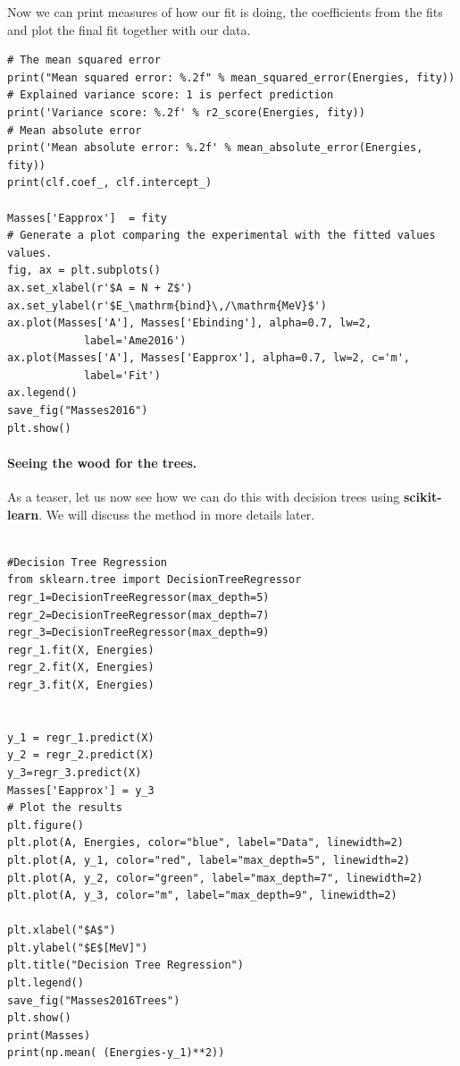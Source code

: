 \documentclass[%
oneside,                 %
final,                   %
10pt]{article}
\begin{document}
Now we can print measures of how our fit is doing, the coefficients from the fits and plot the final fit together with our data.
\begin{verbatim}
# The mean squared error                               
print("Mean squared error: %.2f" % mean_squared_error(Energies, fity))
# Explained variance score: 1 is perfect prediction                                 
print('Variance score: %.2f' % r2_score(Energies, fity))
# Mean absolute error                                                           
print('Mean absolute error: %.2f' % mean_absolute_error(Energies, fity))
print(clf.coef_, clf.intercept_)

Masses['Eapprox']  = fity
# Generate a plot comparing the experimental with the fitted values values.
fig, ax = plt.subplots()
ax.set_xlabel(r'$A = N + Z$')
ax.set_ylabel(r'$E_\mathrm{bind}\,/\mathrm{MeV}$')
ax.plot(Masses['A'], Masses['Ebinding'], alpha=0.7, lw=2,
            label='Ame2016')
ax.plot(Masses['A'], Masses['Eapprox'], alpha=0.7, lw=2, c='m',
            label='Fit')
ax.legend()
save_fig("Masses2016")
plt.show()
\end{verbatim}


\paragraph{Seeing the wood for the trees.}
As a teaser, let us now see how we can do this with decision trees using \textbf{scikit-learn}. We will discuss the method in more details later.


\begin{verbatim}

#Decision Tree Regression
from sklearn.tree import DecisionTreeRegressor
regr_1=DecisionTreeRegressor(max_depth=5)
regr_2=DecisionTreeRegressor(max_depth=7)
regr_3=DecisionTreeRegressor(max_depth=9)
regr_1.fit(X, Energies)
regr_2.fit(X, Energies)
regr_3.fit(X, Energies)


y_1 = regr_1.predict(X)
y_2 = regr_2.predict(X)
y_3=regr_3.predict(X)
Masses['Eapprox'] = y_3
# Plot the results
plt.figure()
plt.plot(A, Energies, color="blue", label="Data", linewidth=2)
plt.plot(A, y_1, color="red", label="max_depth=5", linewidth=2)
plt.plot(A, y_2, color="green", label="max_depth=7", linewidth=2)
plt.plot(A, y_3, color="m", label="max_depth=9", linewidth=2)

plt.xlabel("$A$")
plt.ylabel("$E$[MeV]")
plt.title("Decision Tree Regression")
plt.legend()
save_fig("Masses2016Trees")
plt.show()
print(Masses)
print(np.mean( (Energies-y_1)**2))
\end{verbatim}
\end{document}
